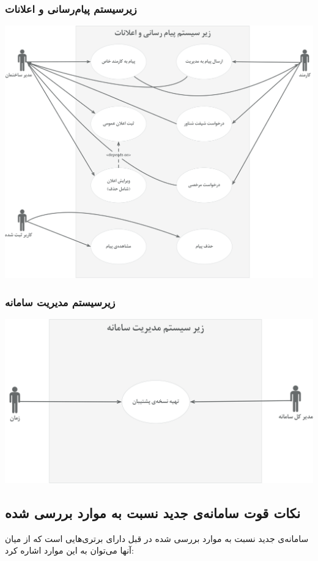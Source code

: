\subsubsection{زیرسیستم پیام‌رسانی و اعلانات}
\includegraphics[width = \textwidth]{images/messaging-man}
\subsubsection{زیرسیستم مدیریت سامانه}
\includegraphics[width = \textwidth]{images/system-man}


\subsection{نکات قوت سامانه‌ی جدید نسبت به موارد بررسی شده}
سامانه‌ی جدید نسبت به موارد بررسی شده در قبل دارای برتری‌هایی است که از میان آنها می‌توان به این موارد اشاره کرد:


